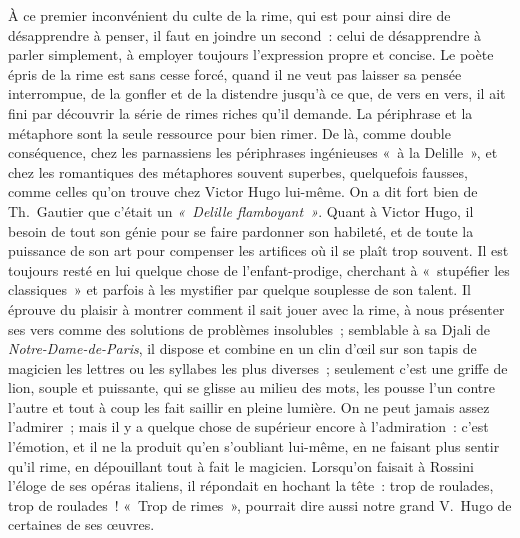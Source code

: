 \documentclass[french,twoside]{book} %
\begin{document}
À ce premier inconvénient du culte de la rime, qui est pour ainsi dire de désapprendre à penser, il faut en joindre un second : celui de désapprendre à parler simplement, à employer toujours l’expression propre et concise. Le poète épris de la rime est sans cesse forcé, quand il ne veut pas laisser sa pensée interrompue, de la gonfler et de la  distendre jusqu’à ce que, de vers en vers, il ait fini par découvrir la série de rimes riches qu’il demande. La périphrase et la métaphore sont la seule ressource pour bien rimer. De là, comme double conséquence, chez les parnassiens les périphrases ingénieuses « à la Delille », et chez les romantiques des métaphores souvent superbes, quelquefois fausses, comme celles qu’on trouve chez Victor Hugo lui-même. On a dit fort bien de Th. Gautier que c’était un \emph{« Delille flamboyant »}. Quant à Victor Hugo, il besoin de tout son génie pour se faire pardonner son habileté, et de toute la puissance de son art pour compenser les artifices où il se plaît trop souvent. Il est toujours resté en lui quelque chose de l’enfant-prodige, cherchant à « stupéfier les classiques » et parfois à les mystifier par quelque souplesse de son talent. Il éprouve du plaisir à montrer comment il sait jouer avec la rime, à nous présenter ses vers comme des solutions de problèmes insolubles ; semblable à sa Djali de \emph{Notre-Dame-de-Paris}, il dispose et combine en un clin d’œil sur son tapis de magicien les lettres ou les syllabes les plus diverses ; seulement c’est une griffe de lion, souple et puissante, qui se glisse au milieu des mots, les pousse l’un contre l’autre et tout à coup les fait saillir en pleine lumière. On ne peut jamais assez l’admirer ; mais il y a quelque chose de supérieur encore à l’admiration : c’est l’émotion, et il ne la produit qu’en s’oubliant lui-même, en ne faisant plus sentir qu’il rime, en dépouillant tout à fait le magicien. Lorsqu’on faisait à Rossini l’éloge de ses opéras italiens, il répondait en hochant la tête : trop de roulades, trop de roulades ! « Trop  de rimes », pourrait dire aussi notre grand V. Hugo de certaines de ses œuvres.\par
\end{document}
